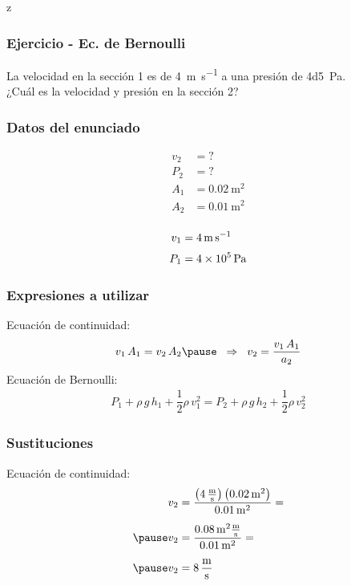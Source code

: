 z\documentclass[14pt]{beamer}
\begin{document}
\begin{frame}
\frametitle{Ejercicio - Ec. de Bernoulli}
La velocidad en la sección 1 es de \SI[per-mode=symbol]{4}{\meter\per\second} a una presión de \SI{4d5}{\pascal}.
\\
\bigskip
\pause
¿Cuál es la velocidad y presión en la sección 2?
\end{frame}
\begin{frame}
\frametitle{Datos del enunciado}
\begin{minipage}{0.4\linewidth}
\begin{align*}
v_{2} &= ? \\[0.25em]
P_{2} &= ? \\[0.25em]
A_{1} &= \SI{0.02}{\square\meter} \\[0.25em]
A_{2} &= \SI{0.01}{\square\meter} \\[0.25em]
\end{align*}
\end{minipage}
\begin{minipage}{0.4\linewidth}
\begin{align*}
v_{1} &= \SI{4}{\meter\per\second} \\[0.25em]
P_{1} &= \SI{4d5}{\pascal}
\end{align*}
\end{minipage}
\end{frame}
\begin{frame}
\frametitle{Expresiones a utilizar}
Ecuación de continuidad:
\pause
\begin{eqnarray*}
\begin{aligned}
v_{1} \, A_{1} = v_{2} \, A_{2} \pause \hspace*{0.2cm} \Rightarrow \hspace*{0.2cm} v_{2} = \dfrac{v_{1} \, A_{1}}{a_{2}}
\end{aligned}
\end{eqnarray*}
\pause
Ecuación de Bernoulli:
\pause
\begin{align*}
P_{1} + \rho \, g \, h_{1} + \dfrac{1}{2} \rho \, v_{1}^{2} = P_{2} + \rho \, g \, h_{2} + \dfrac{1}{2} \rho \, v_{2}^{2}
\end{align*}
\end{frame}
\begin{frame}
\frametitle{Sustituciones}
Ecuación de continuidad:
\pause
\begin{eqnarray*}
\begin{aligned}
v_{2} &= \dfrac{\left(\SI[per-mode=fraction]{4}{\meter\per\second}\right) \left( \SI{0.02}{\square\meter}\right)}{\SI{0.01}{\square\meter}} = \\[0.5em] \pause
v_{2} &= \dfrac{\SI{0.08}{\square\meter} \unit[per-mode=fraction]{\meter\per\second}}{\SI{0.01}{\square\meter}} =  \\[0.5em] \pause
v_{2} &= \SI[per-mode=fraction]{8}{\meter\per\second}
\end{aligned}
\end{eqnarray*}
\end{frame}
\end{document}
